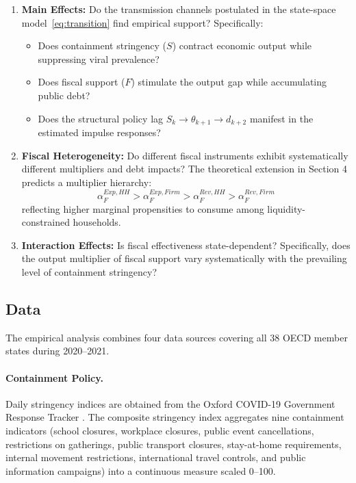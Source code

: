 \documentclass[12pt, a4paper]{article}
\begin{document}
\begin{enumerate}
    \item \textbf{Main Effects:} Do the transmission channels postulated in the state-space model~\eqref{eq:transition} find empirical support? Specifically:
    \begin{itemize}
        \item Does containment stringency ($S$) contract economic output while suppressing viral prevalence?
        \item Does fiscal support ($F$) stimulate the output gap while accumulating public debt?
        \item Does the structural policy lag $S_k \to \theta_{k+1} \to d_{k+2}$ manifest in the estimated impulse responses?
    \end{itemize}
    
    \item \textbf{Fiscal Heterogeneity:} Do different fiscal instruments exhibit systematically different multipliers and debt impacts? The theoretical extension in Section 4 predicts a multiplier hierarchy:
    \begin{equation}
        \alpha^{Exp,HH}_F > \alpha^{Exp,Firm}_F > \alpha^{Rev,HH}_F > \alpha^{Rev,Firm}_F
    \end{equation}
    reflecting higher marginal propensities to consume among liquidity-constrained households.
    
    \item \textbf{Interaction Effects:} Is fiscal effectiveness state-dependent? Specifically, does the output multiplier of fiscal support vary systematically with the prevailing level of containment stringency?
\end{enumerate}
\newpage
\subsection{Data}

The empirical analysis combines four data sources covering all 38 OECD member states during 2020--2021.

\paragraph{Containment Policy.} Daily stringency indices are obtained from the Oxford COVID-19 Government Response Tracker \citep{hale2021global}. The composite stringency index aggregates nine containment indicators (school closures, workplace closures, public event cancellations, restrictions on gatherings, public transport closures, stay-at-home requirements, internal movement restrictions, international travel controls, and public information campaigns) into a continuous measure scaled 0--100.
\end{document}
